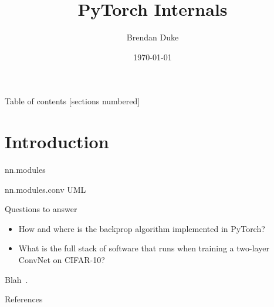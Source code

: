\documentclass{beamer}
\title{PyTorch Internals}
\date{\today}
\author{Brendan Duke}
\institute{University of Guelph}
\begin{document}
\maketitle

\begin{frame}{Table of contents}
  [sections numbered]
  \tableofcontents[hideallsubsections]
\end{frame}

\section{Introduction}

\begin{frame}{nn.modules}
        \center{}
        \scalebox{.2}{}
\end{frame}

\begin{frame}{nn.modules.conv UML}
        \center{}
        \scalebox{.075}{}
\end{frame}

\begin{frame}[fragile]{Questions to answer}
        \begin{itemize}[<+- | alert@+>]
                \item How and where is the backprop algorithm implemented in
                        PyTorch?

                \item What is the full stack of software that runs when
                        training a two-layer ConvNet on CIFAR-10?
        \end{itemize}

        Blah~\cite{DBLP:journals/corr/RussakovskyDSKSMHKKBBF14}.
\end{frame}

\begin{frame}[allowframebreaks]{References}
        
        
\end{frame}
\end{document}

